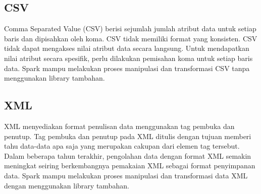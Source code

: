 \subsection{CSV}
Comma Separated Value (CSV) berisi sejumlah jumlah atribut data untuk setiap baris dan dipisahkan oleh koma. CSV tidak memiliki format yang konsisten. CSV tidak dapat mengakses nilai atribut data secara langsung. Untuk mendapatkan nilai atribut secara spesifik, perlu dilakukan pemisahan koma untuk setiap baris data. Spark mampu melakukan proses manipulasi dan transformasi CSV tanpa menggunakan library tambahan.

\subsection{XML}
XML menyediakan format penulisan data menggunakan tag pembuka dan penutup. Tag pembuka dan penutup pada XML ditulis dengan tujuan memberi tahu data-data apa saja yang merupakan cakupan dari elemen tag tersebut. Dalam beberapa tahun terakhir, pengolahan data dengan format XML semakin meningkat seiring berkembangnya pemakaian XML sebagai format penyimpanan data. Spark mampu melakukan proses manipulasi dan transformasi data XML dengan menggunakan library tambahan.
